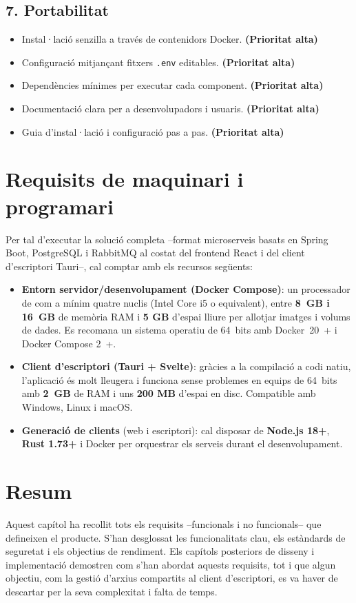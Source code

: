 \subsection{7. Portabilitat}
\begin{itemize}
  \item Instal·lació senzilla a través de contenidors Docker. \textbf{(Prioritat alta)}
  \item Configuració mitjançant fitxers \texttt{.env} editables. \textbf{(Prioritat alta)}
  \item Dependències mínimes per executar cada component. \textbf{(Prioritat alta)}
  \item Documentació clara per a desenvolupadors i usuaris. \textbf{(Prioritat alta)}
  \item Guia d'instal·lació i configuració pas a pas. \textbf{(Prioritat alta)}
\end{itemize}

\section{Requisits de maquinari i programari}
Per tal d'executar la solució completa –format microserveis basats en Spring Boot, PostgreSQL i RabbitMQ al costat del frontend React i del client d'escriptori Tauri–, cal comptar amb els recursos següents:
\begin{itemize}
  \item \textbf{Entorn servidor/desenvolupament (Docker Compose)}: un processador de com a mínim quatre nuclis (Intel Core i5 o equivalent), entre \textbf{8~GB i 16~GB} de memòria RAM i \textbf{5 GB} d'espai lliure per allotjar imatges i volums de dades. Es recomana un sistema operatiu de 64~bits amb Docker~20~+ i Docker Compose 2~+.
  \item \textbf{Client d'escriptori (Tauri + Svelte)}: gràcies a la compilació a codi natiu, l'aplicació és molt lleugera i funciona sense problemes en equips de 64~bits amb \textbf{2~GB} de RAM i uns \textbf{200 MB} d'espai en disc. Compatible amb Windows, Linux i macOS.
  \item \textbf{Generació de clients} (web i escriptori): cal disposar de \textbf{Node.js 18+}, \textbf{Rust 1.73+} i Docker per orquestrar els serveis durant el desenvolupament.
\end{itemize}

\section{Resum}
Aquest capítol ha recollit tots els requisits –funcionals i no funcionals– que defineixen el producte. S'han desglossat les funcionalitats clau, els estàndards de seguretat i els objectius de rendiment. Els capítols posteriors de disseny i implementació demostren com s'han abordat aquests requisits, tot i que algun objectiu, com la gestió d'arxius compartits al client d'escriptori, es va haver de descartar per la seva complexitat i falta de temps.
